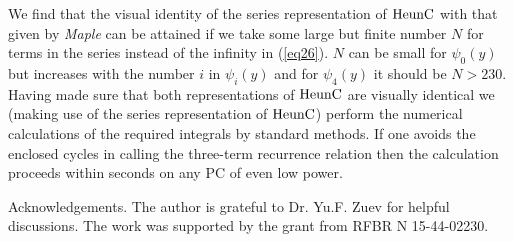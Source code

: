 \documentclass[singlespacing]{elsart}
\begin{document}
We find that the visual identity of the series representation of ${\rm HeunC}$ with that given by {\sl {Maple}} can be attained if we take some large but finite number $N$ for terms in the series instead of the infinity in (\ref{eq26}). $N$ can be small for $\psi_0(y)$ but increases with the number $i$ in $\psi_i(y)$ and for
$\psi_4(y)$ it should be $N>230$. Having made sure that both representations of ${\rm HeunC}$ are visually identical we (making use of the series representation of ${\rm HeunC}$) perform the numerical calculations of the required integrals by standard methods. If one avoids the enclosed cycles in calling the three-term recurrence relation then the calculation proceeds within seconds on any PC of even low power.

Acknowledgements. The author is grateful to Dr. Yu.F. Zuev
for helpful discussions. The work was supported by the grant from RFBR N 15-44-02230.
\end{document}
